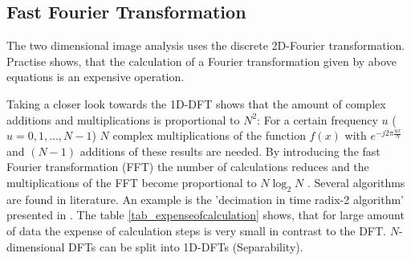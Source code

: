 \subsection{Fast Fourier Transformation}
\label{fft}

The two dimensional image analysis uses the discrete 2D-Fourier transformation.
Practise shows, that the calculation of a Fourier transformation given by
above equations is an expensive operation.

Taking a closer look towards the 1D-DFT shows that the amount of 
complex additions and multiplications is proportional to $N^{2}$:
For a certain frequency $u$ ($u=0,1,\dots,N-1$) 
$N$ complex multiplications of the function  $f(x)$ with $e^{ -j 2 \pi \frac{u x}{N} }$
and $(N-1)$ additions of these results are needed.
By introducing the fast Fourier transformation (FFT) the number of calculations reduces and
the multiplications of the FFT become proportional to $N \log_{2} N$ \cite{Gonzalez:1992}.
Several algorithms are found in literature. An example is the
'decimation in time radix-2 algorithm' presented in \cite{Gonzalez:1992}.
The table \ref{tab_expenseofcalculation} shows, that for large amount of data 
the expense of calculation steps is very small in contrast to the DFT.
$N$-dimensional DFTs can be split into 1D-DFTs (Separability). 
































